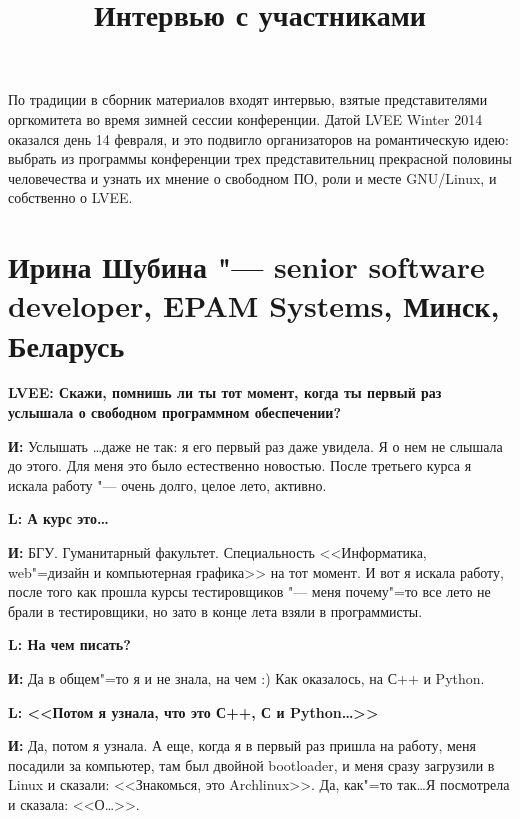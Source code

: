 \documentclass[10pt, a5paper]{article}
\begin{document}
\title{Интервью с участниками}
\date{}
\maketitle

По традиции в сборник материалов входят интервью, взятые представителями оргкомитета во время зимней сессии конференции. Датой LVEE Winter 2014 оказался день 14 февраля, и это подвигло организаторов на романтическую идею: выбрать из программы конференции трех представительниц прекрасной половины человечества и узнать их мнение о свободном ПО, роли и месте GNU/Linux, и собственно о LVEE.

\section{Ирина Шубина "--- senior software developer, EPAM Systems, Минск, Беларусь}

{\noindent \bf LVEE: Скажи, помнишь ли ты тот момент, когда ты первый раз услышала о свободном программном обеспечении?}

{\noindent \bf И:} Услышать \ldots даже не так: я его первый раз даже увидела. Я о нем не слышала до этого. Для меня это было естественно новостью. После третьего курса я искала работу "--- очень долго, целое лето, активно.

{\noindent \bf L: А курс это\ldots}

{\noindent \bf И:} БГУ. Гуманитарный факультет. Специальность <<Информатика, web"=дизайн и компьютерная графика>> на тот момент.  И вот я искала работу, после того как прошла курсы тестировщиков "--- меня почему"=то все лето не брали в тестировщики, но зато в конце лета взяли в программисты.

{\noindent \bf L: На чем писать?}

{\noindent \bf И:} Да в общем"=то я и не знала, на чем :) Как оказалось, на С++ и Python.

{\noindent \bf L: <<Потом я узнала, что это С++, С и Python\ldots>>}

{\noindent \bf И:} Да, потом я узнала. А еще, когда я в первый раз пришла на работу, меня посадили за компьютер, там был двойной bootloader, и меня сразу загрузили в Linux и сказали: <<Знакомься, это Archlinux>>. Да, как"=то так\ldots Я посмотрела и сказала: <<О\ldots >>.
\end{document}
